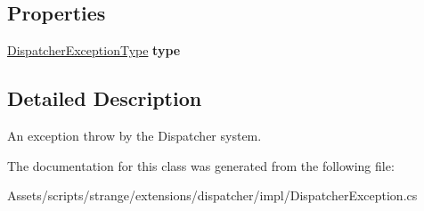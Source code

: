 \subsection*{Properties}
\begin{DoxyCompactItemize}
\item 
\hypertarget{classstrange_1_1extensions_1_1dispatcher_1_1impl_1_1_dispatcher_exception_aaf683623803cc7c0b0cc725ed6349a3b}{\hyperlink{namespacestrange_1_1extensions_1_1dispatcher_1_1api_a03ba459ad62cc042c88405d9419eb4c6}{Dispatcher\-Exception\-Type} {\bfseries type}}\label{classstrange_1_1extensions_1_1dispatcher_1_1impl_1_1_dispatcher_exception_aaf683623803cc7c0b0cc725ed6349a3b}

\end{DoxyCompactItemize}


\subsection{Detailed Description}
An exception throw by the Dispatcher system. 

The documentation for this class was generated from the following file\-:\begin{DoxyCompactItemize}
\item 
Assets/scripts/strange/extensions/dispatcher/impl/Dispatcher\-Exception.\-cs\end{DoxyCompactItemize}
